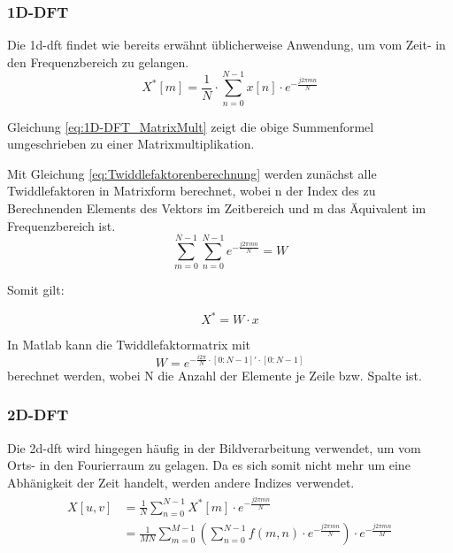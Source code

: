 \subsubsection{1D-DFT}
Die \gls{1d-dft} findet wie bereits erwähnt üblicherweise Anwendung, um vom Zeit- in den Frequenzbereich zu gelangen.
\begin{equation}\label{eq:dft}
 X^* \left[ m \right] = \frac{1}{N} \cdot \sum^{N-1}_{n=0} x[n] \cdot e^{-\frac{j 2 \pi m n}{N}}
\end{equation}



Gleichung \ref{eq:1D-DFT_MatrixMult} zeigt die obige Summenformel umgeschrieben zu einer Matrixmultiplikation.

Mit Gleichung \ref{eq:Twiddlefaktorenberechnung} werden zunächst alle Twiddlefaktoren in Matrixform berechnet, wobei n der Index des zu Berechnenden Elements des Vektors im Zeitbereich und
m das Äquivalent im Frequenzbereich ist.
\begin{equation}\label{eq:Twiddlefaktorenberechnung}
\sum^{N-1 }_{m=0} \sum^{N-1 }_{n=0} e^{-\frac{j 2 \pi m n}{N}} = W
\end{equation}


Somit gilt:

\begin{equation}\label{eq:1D-DFT_MatrixMult}
X^* = W \cdot x
\end{equation}

In Matlab kann die Twiddlefaktormatrix mit
\begin{equation}\label{eq:matlab_dft_faktoren}
 W = e^{-\frac{i 2 \pi}{N}\cdot[0:N-1]'\cdot[0:N-1]}
\end{equation}
berechnet werden, wobei N die Anzahl der Elemente je Zeile bzw. Spalte ist.


\subsubsection{2D-DFT}
Die \gls{2d-dft} wird hingegen häufig in der Bildverarbeitung verwendet, um vom Orts- in den Fourierraum zu gelagen. Da es sich somit nicht mehr um eine Abhänigkeit 
der Zeit handelt, werden andere Indizes verwendet.
\begin{align}
\begin{split}
X[u,v] 	&= \frac{1}{N} \sum^{N-1}_{n=0} X^* \left[ m \right] \cdot e^{-\frac{j 2 \pi m n}{N}}\\
	&= \frac{1}{MN} \sum^{M-1}_{m=0} \left( \sum^{N-1}_{n=0} f(m,n) \cdot e^{-\frac{j 2 \pi m n}{N}} \right) \cdot e^{-\frac{j 2 \pi m n}{M}}
\end{split}
\end{align}

